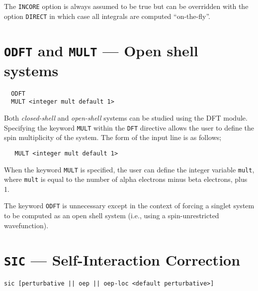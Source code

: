 The \verb+INCORE+ option is always assumed to be true but can be
overridden with the option \verb+DIRECT+ in which case all integrals
are computed ``on-the-fly''.

\fussy

\section{{\tt ODFT} and {\tt MULT} --- Open shell systems}
\begin{verbatim}
  ODFT
  MULT <integer mult default 1>
\end{verbatim}

Both {\sl closed-shell} and {\sl open-shell} systems can be studied using
the DFT module.  Specifying the keyword \verb+MULT+ within the \verb+DFT+
directive allows the user to define the spin multiplicity of the system.
The form of the input line is as follows;
\begin{verbatim}
   MULT <integer mult default 1> 
\end{verbatim}
When the keyword \verb+MULT+ is specified, the user can define the integer
variable \verb+mult+, where \verb+mult+ is equal to the number of alpha 
electrons minus beta electrons, plus 1.

The keyword \verb+ODFT+ is unnecessary except in the context
of forcing a singlet system to be computed as an open shell
system (i.e., using a spin-unrestricted wavefunction).

\section{{\tt SIC} --- Self-Interaction Correction}

\begin{verbatim}
sic [perturbative || oep || oep-loc <default perturbative>]
\end{verbatim}

